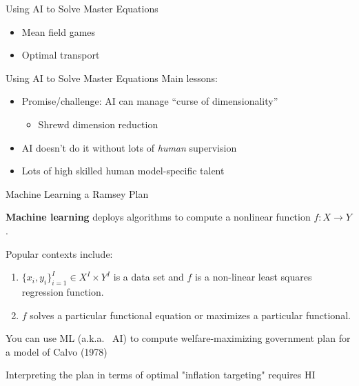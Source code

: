 \documentclass[aspectratio=169]{beamer}
\theoremstyle{Definition}
\begin{document}
\begin{frame}{Using AI to Solve Master Equations}
\begin{itemize}
\item Mean field games
\item Optimal transport
\end{itemize}

\end{frame}



\begin{frame}{Using AI to Solve Master Equations}
Main lessons:
\begin{itemize}
\item Promise/challenge: AI can manage ``curse of dimensionality''
\begin{itemize}
\item Shrewd dimension reduction
\end{itemize}
\item AI doesn't do it without lots of {\em human} supervision
\item Lots of high skilled human model-specific talent
\end{itemize}

\end{frame}


\begin{frame}{Machine Learning a Ramsey Plan}

    \textbf{Machine learning} deploys algorithms to 
    compute a nonlinear function $f : X \rightarrow Y$. %

    Popular contexts include:
    \begin{enumerate}
    \item $\{x_i, y_i\}_{i=1}^I \in X^I \times Y^I $ is a data set and $f$ is 
    a non-linear least squares regression function.
    \item $f$ solves a particular functional equation or maximizes a particular 
    functional.
    \end{enumerate}

    You can  use ML (a.k.a.~ AI) to compute welfare-maximizing  government plan for a model
    of   Calvo (1978)
    
    \medskip
    
    Interpreting the plan in terms of optimal "inflation targeting" requires  HI
    
\end{frame}
\end{document}

